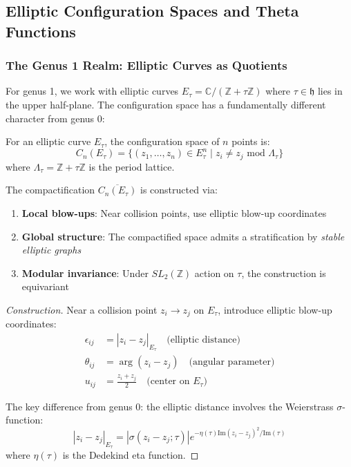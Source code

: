 \subsection{Elliptic Configuration Spaces and Theta Functions}

\subsubsection{The Genus 1 Realm: Elliptic Curves as Quotients}

For genus 1, we work with elliptic curves $E_\tau = \mathbb{C}/(\mathbb{Z} + \tau\mathbb{Z})$ where $\tau \in \mathfrak{h}$ lies in the upper half-plane. The configuration space has a fundamentally different character from genus 0:

\begin{definition}
For an elliptic curve $E_\tau$, the configuration space of $n$ points is:
\[
C_n(E_\tau) = \{(z_1, \ldots, z_n) \in E_\tau^n \mid z_i \neq z_j \text{ mod } \Lambda_\tau\}
\]
where $\Lambda_\tau = \mathbb{Z} + \tau\mathbb{Z}$ is the period lattice.
\end{definition}

\begin{theorem}
The compactification $\overline{C_n(E_\tau)}$ is constructed via:
\begin{enumerate}
\item \textbf{Local blow-ups}: Near collision points, use elliptic blow-up coordinates
\item \textbf{Global structure}: The compactified space admits a stratification by \emph{stable elliptic graphs}
\item \textbf{Modular invariance}: Under $SL_2(\mathbb{Z})$ action on $\tau$, the construction is equivariant
\end{enumerate}
\end{theorem}

\begin{proof}[Construction]
Near a collision point $z_i \to z_j$ on $E_\tau$, introduce elliptic blow-up coordinates:
\begin{align}
\epsilon_{ij} &= |z_i - z_j|_{E_\tau} \quad \text{(elliptic distance)} \\
\theta_{ij} &= \arg(z_i - z_j) \quad \text{(angular parameter)} \\
u_{ij} &= \frac{z_i + z_j}{2} \quad \text{(center on } E_\tau)
\end{align}

The key difference from genus 0: the elliptic distance involves the Weierstrass $\sigma$-function:
\[
|z_i - z_j|_{E_\tau} = |\sigma(z_i - z_j; \tau)|e^{-\eta(\tau)\text{Im}(z_i - z_j)^2/\text{Im}(\tau)}
\]
where $\eta(\tau)$ is the Dedekind eta function.
\end{proof}

